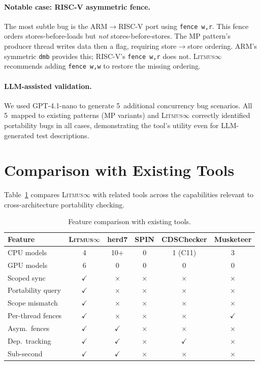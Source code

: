 \documentclass[10pt]{article}
\newcommand{\litmus}{\textsc{Litmus$\infty$}}
\newcommand{\cmark}{$\checkmark$}
\newcommand{\xmark}{$\times$}
\begin{document}
\paragraph{Notable case: RISC-V asymmetric fence.}
The most subtle bug is the ARM$\to$RISC-V port using
\texttt{fence~w,r}. This fence orders stores-before-loads but \emph{not}
stores-before-stores. The MP pattern's producer thread writes data then
a flag, requiring store$\to$store ordering. ARM's symmetric
\texttt{dmb} provides this; RISC-V's \texttt{fence~w,r} does not.
\litmus{} recommends adding \texttt{fence~w,w} to restore the missing
ordering.

\paragraph{LLM-assisted validation.}
We used GPT-4.1-nano to generate 5~additional concurrency bug scenarios.
All 5~mapped to existing patterns (MP variants) and \litmus{} correctly
identified portability bugs in all cases, demonstrating the tool's
utility even for LLM-generated test descriptions.

\section{Comparison with Existing Tools}
\label{sec:comparison}

Table~\ref{tab:comparison} compares \litmus{} with related tools across
the capabilities relevant to cross-architecture portability checking.

\begin{table}[h]
\centering
\caption{Feature comparison with existing tools.}
\label{tab:comparison}
\small
\begin{tabular}{lccccc}
\toprule
\textbf{Feature} & \textbf{\litmus{}} & \textbf{herd7} & \textbf{SPIN} & \textbf{CDSChecker} & \textbf{Musketeer} \\
\midrule
CPU models & 4 & 10+ & 0 & 1 (C11) & 3 \\
GPU models & 6 & 0 & 0 & 0 & 0 \\
Scoped sync & \cmark & \xmark & \xmark & \xmark & \xmark \\
Portability query & \cmark & \xmark & \xmark & \xmark & \xmark \\
Scope mismatch & \cmark & \xmark & \xmark & \xmark & \xmark \\
Per-thread fences & \cmark & \xmark & \xmark & \xmark & \cmark \\
Asym.\ fences & \cmark & \cmark & \xmark & \xmark & \xmark \\
Dep.\ tracking & \cmark & \cmark & \xmark & \cmark & \xmark \\
Sub-second & \cmark & \cmark & \xmark & \xmark & \xmark \\
\bottomrule
\end{tabular}
\end{table}
\end{document}

